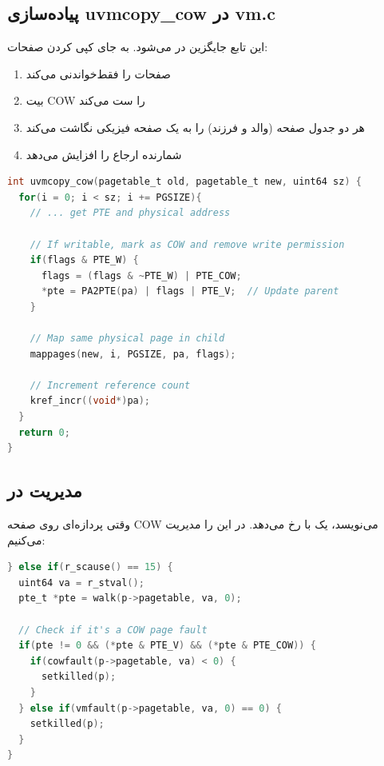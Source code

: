 \documentclass[12pt,a4paper]{article}
\begin{document}
\subsection{پیاده‌سازی uvmcopy\_cow در vm.c}
این تابع جایگزین  در  می‌شود. به جای کپی کردن صفحات:
\begin{enumerate}
    \item صفحات را فقط‌خواندنی می‌کند
    \item بیت COW را ست می‌کند
    \item هر دو جدول صفحه (والد و فرزند) را به یک صفحه فیزیکی نگاشت می‌کند
    \item شمارنده ارجاع را افزایش می‌دهد
\end{enumerate}

\begin{latin}
\begin{lstlisting}[language=C, caption={تابع uvmcopy\_cow}]
int uvmcopy_cow(pagetable_t old, pagetable_t new, uint64 sz) {
  for(i = 0; i < sz; i += PGSIZE){
    // ... get PTE and physical address
    
    // If writable, mark as COW and remove write permission
    if(flags & PTE_W) {
      flags = (flags & ~PTE_W) | PTE_COW;
      *pte = PA2PTE(pa) | flags | PTE_V;  // Update parent
    }
    
    // Map same physical page in child
    mappages(new, i, PGSIZE, pa, flags);
    
    // Increment reference count
    kref_incr((void*)pa);
  }
  return 0;
}
\end{lstlisting}
\end{latin}

\subsection{مدیریت  در }
وقتی پردازه‌ای روی صفحه COW می‌نویسد، یک  با  رخ می‌دهد. در  این را مدیریت می‌کنیم:

\begin{latin}
\begin{lstlisting}[language=C, caption={مدیریت Page Fault در usertrap}]
} else if(r_scause() == 15) {
  uint64 va = r_stval();
  pte_t *pte = walk(p->pagetable, va, 0);
  
  // Check if it's a COW page fault
  if(pte != 0 && (*pte & PTE_V) && (*pte & PTE_COW)) {
    if(cowfault(p->pagetable, va) < 0) {
      setkilled(p);
    }
  } else if(vmfault(p->pagetable, va, 0) == 0) {
    setkilled(p);
  }
}
\end{lstlisting}
\end{latin}
\end{document}
